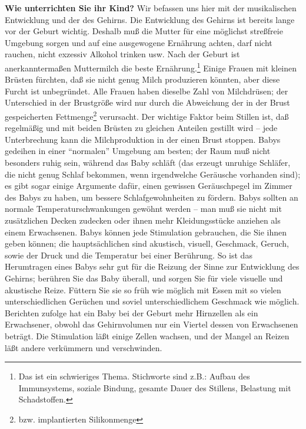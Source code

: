 \textbf{Wie unterrichten Sie ihr Kind?}
Wir befassen uns hier mit der musikalischen Entwicklung und der des Gehirns.
Die Entwicklung des Gehirns ist bereits lange vor der Geburt wichtig.
Deshalb muß die Mutter für eine möglichst streßfreie Umgebung sorgen und auf eine ausgewogene Ernährung achten, darf nicht rauchen, nicht exzessiv Alkohol trinken usw.
Nach der Geburt ist anerkanntermaßen Muttermilch die beste Ernährung.\footnote{Das ist ein schwieriges Thema. Stichworte sind z.B.: Aufbau des Immunsystems, soziale Bindung, gesamte Dauer des Stillens, Belastung mit Schadstoffen.}
Einige Frauen mit kleinen Brüsten fürchten, daß sie nicht genug Milch produzieren könnten, aber diese Furcht ist unbegründet.
Alle Frauen haben dieselbe Zahl von Milchdrüsen; der Unterschied in der Brustgröße wird nur durch die Abweichung der in der Brust gespeicherten Fettmenge\footnote{bzw. implantierten Silikonmenge} verursacht.
Der wichtige Faktor beim Stillen ist, daß regelmäßig und mit beiden Brüsten zu gleichen Anteilen gestillt wird -- jede Unterbrechung kann die Milchproduktion in der einen Brust stoppen.
Babys gedeihen in einer \enquote{normalen} Umgebung am besten; der Raum muß nicht besonders ruhig sein, während das Baby schläft (das erzeugt unruhige Schläfer, die nicht genug Schlaf bekommen, wenn irgendwelche Geräusche vorhanden sind); es gibt sogar einige Argumente dafür, einen gewissen Geräuschpegel im Zimmer des Babys zu haben, um bessere Schlafgewohnheiten zu fördern.
Babys sollten an normale Temperaturschwankungen gewöhnt werden -- man muß sie nicht mit zusätzlichen Decken zudecken oder ihnen mehr Kleidungsstücke anziehen als einem Erwachsenen.
Babys können jede Stimulation gebrauchen, die Sie ihnen geben können; die hauptsächlichen sind akustisch, visuell, Geschmack, Geruch, sowie der Druck und die Temperatur bei einer Berührung.
So ist das Herumtragen eines Babys sehr gut für die Reizung der Sinne zur Entwicklung des Gehirns; berühren Sie das Baby überall, und sorgen Sie für viele visuelle und akustische Reize.
Füttern Sie sie so früh wie möglich mit Essen mit so vielen unterschiedlichen Gerüchen und soviel unterschiedlichem Geschmack wie möglich.
Berichten zufolge hat ein Baby bei der Geburt mehr Hirnzellen als ein Erwachsener, obwohl das Gehirnvolumen nur ein Viertel dessen von Erwachsenen beträgt.
Die Stimulation läßt einige Zellen wachsen, und der Mangel an Reizen läßt andere verkümmern und verschwinden.

